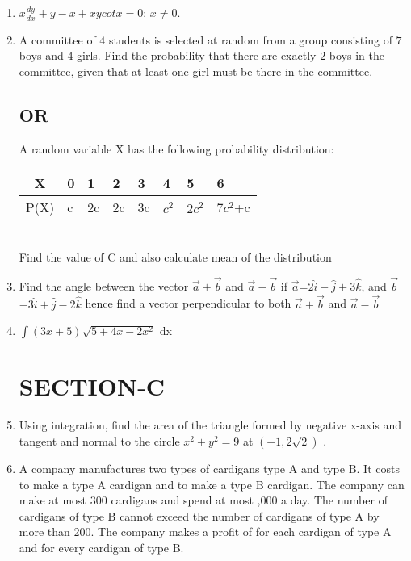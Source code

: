 \documentclass{article}
\begin{document}
\begin{enumerate}
      \item  $x\frac {dy} {dx}  + y - x + xycotx=0$; $x\neq0$.
	      
      \item  A committee of $4$ students is selected at random from a group consisting of $7$ boys and $4$ girls. Find the probability that there are exactly $2$ boys in the committee, given that at least one girl must be there in the committee.\subsection*{\centering OR} A random variable X has the following probability distribution:\\
	      \begin{table}[htb]
 \centering
  \begin{tabularx}{\textwidth}{|c|X|X|X|X|X|X|X|}
 \hline
 X & 0 & 1 & 2 & 3 & 4 & 5 & 6 \\
  \hline
 P(X) & c & 2c & 2c & 3c & $c^2$ & $2c^2$ & $7c^2$+c \\
  \hline
  \end{tabularx}                                                   \end{table}\\
	Find the value of C and also calculate mean of the distribution	      

      \item Find the angle between the vector $\vec{a}+\vec{b}$ and $\vec{a}-\vec{b}$ if $\vec{a}$=$2\hat{i}-\hat{j}+3\hat{k}$, and $\vec{b}$=$3\hat{i}+\hat{j}-2\hat{k}$ hence find a vector perpendicular to both $\vec{a}+\vec{b}$ and $\vec{a}-\vec{b}$

	      	      

      \item $\int (3x+5)\sqrt {5+4x-2x^2}$ dx

	      \section*{\centering SECTION-C}	      

      \item Using integration, find the area of the triangle formed by negative x-axis and tangent and normal to the circle $x ^ 2 + y ^ 2 = 9$ at $(- 1, 2\sqrt2)$ .  					     
      \item A company manufactures two types of cardigans type A and type B. It costs  to make a type A cardigan and  to make a type B cardigan. The company can make at most $300$ cardigans and spend at most ,000 a day. The number of cardigans of type B cannot exceed the number of cardigans of type A by more than 200. The company makes a profit of  for each cardigan of type A and  for every cardigan of type B.


\end{enumerate}
\end{document}
